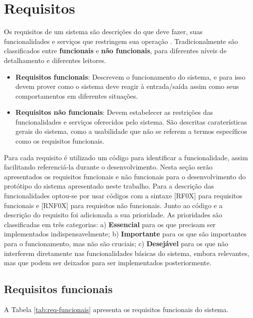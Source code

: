 \section{Requisitos}

Os requisitos de um sistema são descrições do que deve fazer, suas funcionalidades e serviços que restringem sua operação \citep{Sommerville2010}. Tradicionalmente são classificados entre \textbf{funcionais} e \textbf{não funcionais}, para diferentes níveis de detalhamento e diferentes leitores.

\begin{itemize}
	\item{\textbf{Requisitos funcionais}: Descrevem o funcionamento do sistema, e para isso devem prover como o sistema deve reagir à entrada/saída assim como seus comportamentos em diferentes situações.}
	
	\item{\textbf{Requisitos não funcionais}: Devem estabelecer as restrições das funcionalidades e serviços oferecidos pelo sistema. São descritas caraterísticas gerais do sistema, como a usabilidade que não se referem a termos específicos como os requisitos funcionais.}
\end{itemize}

Para cada requisito é utilizado um código para identificar a funcionalidade, assim facilitando referenciá-la durante o desenvolvimento. Nesta seção serão apresentados os requisitos funcionais e não funcionais para o desenvolvimento do protótipo do sistema apresentado neste trabalho. Para a descrição das funcionalidades optou-se por usar códigos com a sintaxe [RF0X] para requisitos funcionais e [RNF0X] para requisitos não funcionais. Junto ao código e a descrição do requisito foi adicionada a sua prioridade. As prioridades são classificadas em três categorias: a) \textbf{Essencial} para os que precisam ser implementados indispensavelmente; b) \textbf{Importante} para os que são importantes para o funcionamento, mas não são cruciais; c) \textbf{Desejável} para os que não interferem diretamente nas funcionalidades básicas do sistema, embora relevantes, mas que podem ser deixados para ser implementados posteriormente.

\subsection{Requisitos funcionais}

A Tabela \ref{tab:req-funcionais} apresenta os requisitos funcionais do sistema.

